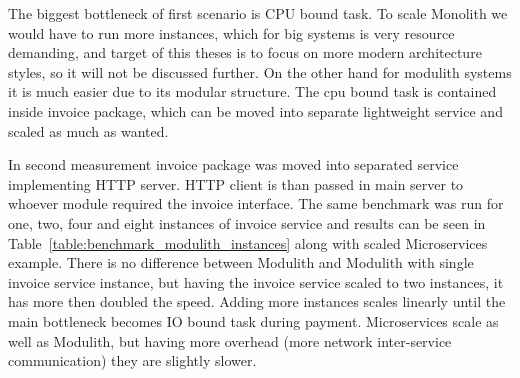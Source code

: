 The biggest bottleneck of first scenario is CPU bound task. To scale Monolith we would have to run more instances, which for big systems is very resource demanding, and target of this theses is to focus on more modern architecture styles, so it will not be discussed further. On the other hand for modulith systems it is much easier due to its modular structure. The cpu bound task is contained inside invoice package, which can be moved into separate lightweight service and scaled as much as wanted.

In second measurement invoice package was moved into separated service implementing HTTP server. HTTP client is than passed in main server to whoever module required the invoice interface. The same benchmark was run for one, two, four and eight instances of invoice service and results can be seen in Table~\ref{table:benchmark_modulith_instances} along with scaled Microservices example. There is no difference between Modulith and Modulith with single invoice service instance, but having the invoice service scaled to two instances, it has more then doubled the speed. Adding more instances scales linearly until the main bottleneck becomes IO bound task during payment. Microservices scale as well as Modulith, but having more overhead (more network inter-service communication) they are slightly slower.

